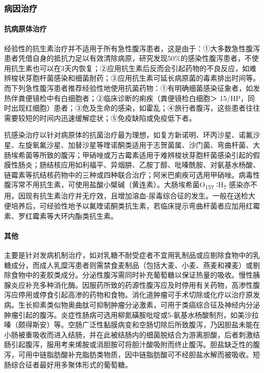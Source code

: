 \subsubsection{病因治疗}

\paragraph{抗病原体治疗}

经验性的抗生素治疗并不适用于所有急性腹泻患者，这是由于：①大多数急性腹泻患者凭借自身的抵抗力足以有效清除病原，研究发现50\%的感染性腹泻患者，不使用抗生素也可以在3天内恢复；②应用抗生素后反而会引起药物的不良反应，如难辨梭状芽胞杆菌感染和细菌耐药；③应用抗生素可延长病原菌的毒素排出时间等。而下列急性腹泻患者推荐经验性地使用抗菌药物：①有明确细菌感染征象者，如发热伴粪便镜检中有白细胞者；②临床诊断的痢疾（粪便镜检白细胞＞
15/HP，同时出现红细胞）患者；③危及生命的感染，如霍乱；④旅行者腹泻，这些患者往往需要较短的时间内迅速缓解症状；⑤免疫缺陷或免疫低下者。

抗感染治疗以针对病原体的抗菌治疗最为理想，如复方新诺明、环丙沙星、诺氟沙星、左旋氧氟沙星、加替沙星等喹诺酮类适用于志贺菌属、沙门菌、弯曲杆菌、大肠埃希菌等所致的腹泻；甲硝唑或万古霉素适用于难辨梭状芽胞杆菌感染引起的假膜性肠炎；肠结核应用如利福平、异烟肼、乙胺丁醇、吡嗪酰胺、对氨基水杨酸、链霉素等抗结核药物中的三种或四种联合治疗；阿米巴痢疾可选用甲硝唑。病毒性腹泻常不用抗生素，可使用盐酸小檗碱（黄连素）。大肠埃希菌O\textsubscript{157}
∶H\textsubscript{7}
感染亦不用，因现有抗生素治疗并无疗效，且增加溶血-尿毒综合征的发生。一般在送检大便培养后，可经验性地予以氟喹诺酮类抗生素，若临床提示弯曲杆菌者应加用红霉素、罗红霉素等大环内酯类抗生素。

\paragraph{其他}

主要是针对发病机制治疗，如对乳糖不耐受症者不宜用乳制品或应剔除食物中的乳糖成分，而成人乳糜泻患者则需禁食麦制品（包括大麦、小麦、燕麦和裸麦）或剔除食物中的麦胶类成分。分泌性腹泻需同时补充葡萄糖以保证热量的吸收。慢性胰腺炎应补充多种消化酶。因服药所致的药源性腹泻应及时停用有关药物，高渗性腹泻应停用或停食引起高渗的药物和食物。消化道肿瘤可手术切除或化疗以治疗原发病。生长抑素类似物奥曲肽可抑制肿瘤分泌激素，可用于类癌综合征及神经内分泌肿瘤引起的腹泻。炎症性肠病可选用柳氮磺胺吡啶或5-氨基水杨酸制剂，如美沙拉嗪（颇得斯安）等。空肠广泛性黏膜病变和空肠切除后所致腹泻，乃因胆盐未能在小肠被重吸收而进入结肠，并在此被结肠内的细菌脱结合为游离胆酸，后者刺激结肠引起腹泻，服用考来烯胺或消胆胺可将胆汁酸吸附而终止腹泻。胆盐缺乏性的腹泻，可用中链脂肪酸补充脂肪类物质，因中链脂肪酸可不经胆盐水解而被吸收。短肠综合征者最好用多聚体形式的葡萄糖。

